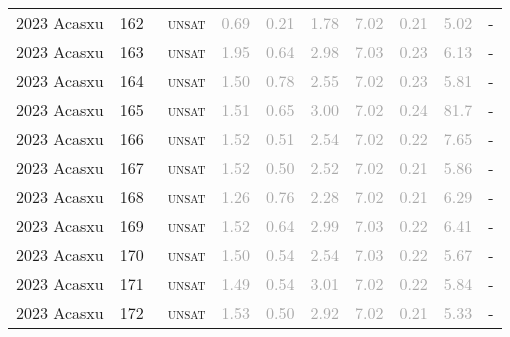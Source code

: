 \begin{center}
{\begin{longtable}{@{}llllllllll@{}}
2023 Acasxu & 162 & ~\textsc{unsat} & \textcolor{darkgray}{0.69} & \textcolor{darkgray}{0.21} & \textcolor{darkgray}{1.78} & \textcolor{darkgray}{7.02} & \textcolor{darkgray}{0.21} & \textcolor{darkgray}{5.02} & - \\
2023 Acasxu & 163 & ~\textsc{unsat} & \textcolor{darkgray}{1.95} & \textcolor{darkgray}{0.64} & \textcolor{darkgray}{2.98} & \textcolor{darkgray}{7.03} & \textcolor{darkgray}{0.23} & \textcolor{darkgray}{6.13} & - \\
2023 Acasxu & 164 & ~\textsc{unsat} & \textcolor{darkgray}{1.50} & \textcolor{darkgray}{0.78} & \textcolor{darkgray}{2.55} & \textcolor{darkgray}{7.02} & \textcolor{darkgray}{0.23} & \textcolor{darkgray}{5.81} & - \\
2023 Acasxu & 165 & ~\textsc{unsat} & \textcolor{darkgray}{1.51} & \textcolor{darkgray}{0.65} & \textcolor{darkgray}{3.00} & \textcolor{darkgray}{7.02} & \textcolor{darkgray}{0.24} & \textcolor{darkgray}{81.7} & - \\
2023 Acasxu & 166 & ~\textsc{unsat} & \textcolor{darkgray}{1.52} & \textcolor{darkgray}{0.51} & \textcolor{darkgray}{2.54} & \textcolor{darkgray}{7.02} & \textcolor{darkgray}{0.22} & \textcolor{darkgray}{7.65} & - \\
2023 Acasxu & 167 & ~\textsc{unsat} & \textcolor{darkgray}{1.52} & \textcolor{darkgray}{0.50} & \textcolor{darkgray}{2.52} & \textcolor{darkgray}{7.02} & \textcolor{darkgray}{0.21} & \textcolor{darkgray}{5.86} & - \\
2023 Acasxu & 168 & ~\textsc{unsat} & \textcolor{darkgray}{1.26} & \textcolor{darkgray}{0.76} & \textcolor{darkgray}{2.28} & \textcolor{darkgray}{7.02} & \textcolor{darkgray}{0.21} & \textcolor{darkgray}{6.29} & - \\
2023 Acasxu & 169 & ~\textsc{unsat} & \textcolor{darkgray}{1.52} & \textcolor{darkgray}{0.64} & \textcolor{darkgray}{2.99} & \textcolor{darkgray}{7.03} & \textcolor{darkgray}{0.22} & \textcolor{darkgray}{6.41} & - \\
2023 Acasxu & 170 & ~\textsc{unsat} & \textcolor{darkgray}{1.50} & \textcolor{darkgray}{0.54} & \textcolor{darkgray}{2.54} & \textcolor{darkgray}{7.03} & \textcolor{darkgray}{0.22} & \textcolor{darkgray}{5.67} & - \\
2023 Acasxu & 171 & ~\textsc{unsat} & \textcolor{darkgray}{1.49} & \textcolor{darkgray}{0.54} & \textcolor{darkgray}{3.01} & \textcolor{darkgray}{7.02} & \textcolor{darkgray}{0.22} & \textcolor{darkgray}{5.84} & - \\
2023 Acasxu & 172 & ~\textsc{unsat} & \textcolor{darkgray}{1.53} & \textcolor{darkgray}{0.50} & \textcolor{darkgray}{2.92} & \textcolor{darkgray}{7.02} & \textcolor{darkgray}{0.21} & \textcolor{darkgray}{5.33} & - \\

\end{longtable}}
\end{center}
